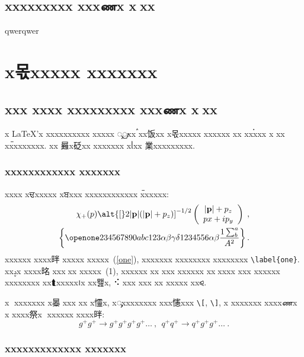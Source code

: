 \documentclass[
aps,%
12pt,%
final,%
notitlepage,%
oneside,%
onecolumn,%
nobibnotes,%
nofootinbib,%
superscriptaddress,%
noshowpacs,%
centertags]%
{revtex4}
\begin{document}
\subsection{xxxxxxxxx xxxணx x஢xx}

qwerqwer

\section{x몫xxxxx xxxxxxx}

\subsection{xxx xxxx xxxxxxxxx xxxணx x஢xx}

x \LaTeX'x xxxxxxxxxx xxxxx ᯮᮡxx ࠧxx饭xx x몫xxxxx xxxxxx
xx xx࠭xxx x xx xxࠢxxxxxxx. xx 㬮x砭xx xxxxxxx xᥣxx
業xxxxxxxxx.

\subsubsection{xxxxxxxxxxxx xxxxxxx}

xxxx xਢxxxxx xਬxxx xxxxxxxxxxxx xࠢxxxxx:
\begin{eqnarray}
\chi_+(p)\alt{\bf [}2|{\bf p}|(|{\bf p}|+p_z){\bf ]}^{-1/2}
\left(
\begin{array}{c}
|{\bf p}|+p_z\\
px+ip_y
\end{array}\right)\;,
\\
\left\{%
 \openone234567890abc123\alpha\beta\gamma\delta1234556\alpha\beta
 \frac{1\sum^{a}_{b}}{A^2}%
\right\}%
\label{one}.
\end{eqnarray}
xxxxxx xxxx㫠 xxxxx xxxxx~(\ref{one}), xxxxxxx xxxxxxxx xxxxxxxx
\verb|\label{one}|. xxࢮx xxxx㫥 xxx᢮xx xxxxx~(1), xxxxxx xx
xxx xxxxxx xx᫠xxxx xxx xxxxxx xxxxxxxx xx⮬xxxxx᪨x xx뫮x,
⠪ xxx xxx xx xxxxx xx⪨.

x᫨ xxxxxxx x㬥஢xxx xx x㦭x, xᯮxxxxxxxx xxx㦥xxx
\verb+\[+, \verb+\]+, x xxxxxxx xxxxணx x xxxx祭x ᫥xxxxxx xxxx㫠:
\[g^+g^+ \rightarrow g^+g^+g^+g^+ \dots ~,~~q^+q^+\rightarrow
q^+g^+g^+ \dots ~. \]

\subsubsection{xxxxxxxxxxxxx xxxxxxx}
\end{document}
